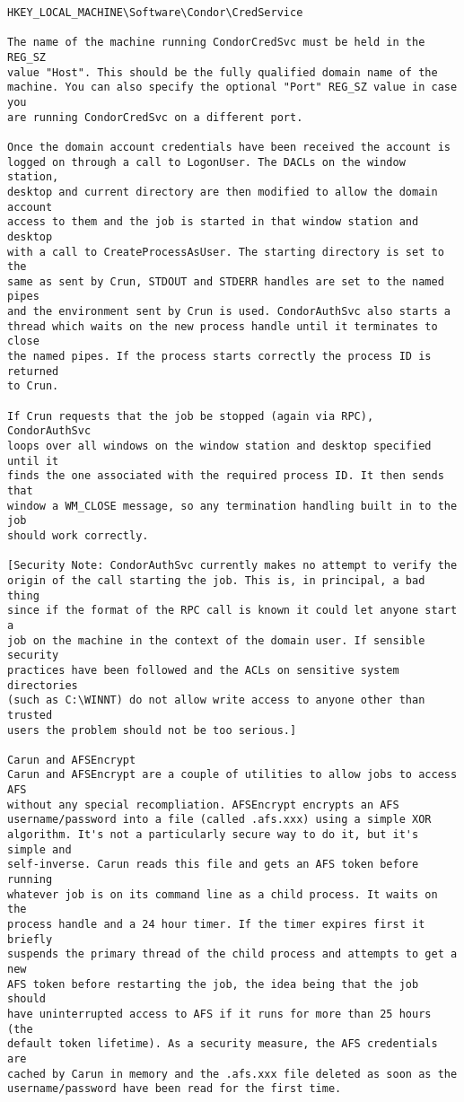 \begin{description}
\begin{verbatim}
HKEY_LOCAL_MACHINE\Software\Condor\CredService

The name of the machine running CondorCredSvc must be held in the REG_SZ 
value "Host". This should be the fully qualified domain name of the 
machine. You can also specify the optional "Port" REG_SZ value in case you 
are running CondorCredSvc on a different port.

Once the domain account credentials have been received the account is 
logged on through a call to LogonUser. The DACLs on the window station, 
desktop and current directory are then modified to allow the domain account 
access to them and the job is started in that window station and desktop 
with a call to CreateProcessAsUser. The starting directory is set to the 
same as sent by Crun, STDOUT and STDERR handles are set to the named pipes 
and the environment sent by Crun is used. CondorAuthSvc also starts a 
thread which waits on the new process handle until it terminates to close 
the named pipes. If the process starts correctly the process ID is returned 
to Crun.

If Crun requests that the job be stopped (again via RPC), CondorAuthSvc 
loops over all windows on the window station and desktop specified until it 
finds the one associated with the required process ID. It then sends that 
window a WM_CLOSE message, so any termination handling built in to the job 
should work correctly.

[Security Note: CondorAuthSvc currently makes no attempt to verify the 
origin of the call starting the job. This is, in principal, a bad thing 
since if the format of the RPC call is known it could let anyone start a 
job on the machine in the context of the domain user. If sensible security 
practices have been followed and the ACLs on sensitive system directories 
(such as C:\WINNT) do not allow write access to anyone other than trusted 
users the problem should not be too serious.]

Carun and AFSEncrypt
Carun and AFSEncrypt are a couple of utilities to allow jobs to access AFS 
without any special recompliation. AFSEncrypt encrypts an AFS 
username/password into a file (called .afs.xxx) using a simple XOR 
algorithm. It's not a particularly secure way to do it, but it's simple and 
self-inverse. Carun reads this file and gets an AFS token before running 
whatever job is on its command line as a child process. It waits on the 
process handle and a 24 hour timer. If the timer expires first it briefly 
suspends the primary thread of the child process and attempts to get a new 
AFS token before restarting the job, the idea being that the job should 
have uninterrupted access to AFS if it runs for more than 25 hours (the 
default token lifetime). As a security measure, the AFS credentials are 
cached by Carun in memory and the .afs.xxx file deleted as soon as the 
username/password have been read for the first time.


\end{verbatim}
\end{description}
